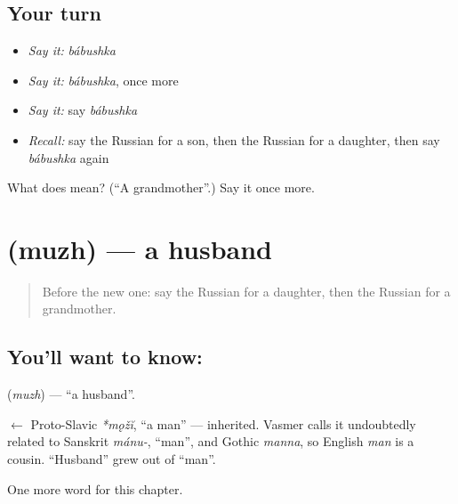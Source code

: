 \subsection*{Your turn}
\begin{itemize}
\raggedright
  \item \emph{Say it:} \emph{bábushka}
  \item \emph{Say it:} \emph{bábushka}, once more
  \item \emph{Say it:} say \emph{bábushka}
  \item \emph{Recall:} say the Russian for a son, then the Russian for a daughter, then say \emph{bábushka} again
\end{itemize}

\begin{tcolorbox}[breakable,colback=teal!4,colframe=teal!35!black,title={Before you move on}]
What does  mean? (\textquotedblleft{}A grandmother\textquotedblright{}.) Say it once more.
\end{tcolorbox}
\section[\texorpdfstring{\ru{муж} (muzh)}{муж (muzh)}]{ (muzh) — a husband}

\label{lesson:RU-C35-husband}



\begin{quote}
Before the new one: say the Russian for a daughter, then the Russian for a grandmother.
\end{quote}

\subsection*{You'll want to know: }
\textbf{} (\emph{muzh}) — \textquotedblleft{}a husband\textquotedblright{}.

\begin{cousinweb}
\textbf{} $\leftarrow$ Proto-Slavic \emph{*mǫžĭ}, \textquotedblleft{}a man\textquotedblright{} — inherited. Vasmer calls it undoubtedly related to Sanskrit \emph{mánu-}, \textquotedblleft{}man\textquotedblright{}, and Gothic \emph{manna}, so English \emph{man} is a cousin. \textquotedblleft{}Husband\textquotedblright{} grew out of \textquotedblleft{}man\textquotedblright{}.
\end{cousinweb}

\begin{grammarlens}[title={What you've built}]
One more word for this chapter.
\end{grammarlens}

